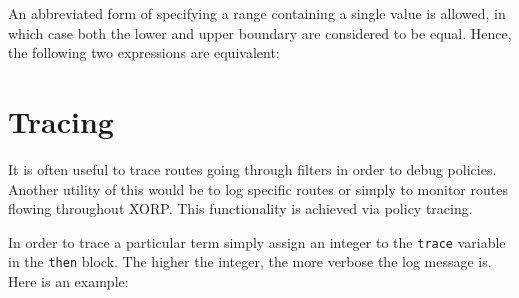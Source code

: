 \noindent{}

An abbreviated form of specifying a range containing a single value is allowed, in which case both the lower and upper boundary are considered to be equal.  Hence, the following two expressions are equivalent:

\noindent{}


\section{Tracing}
It is often useful to trace routes going through filters in order to debug
policies.  Another utility of this would be to log specific routes or simply to
monitor routes flowing throughout XORP.  This functionality is achieved via policy
tracing.

In order to trace a particular term simply assign an integer to the {\tt trace}
variable in the {\tt then} block.  The higher the integer, the more verbose the
log message is.  Here is an example:

\noindent{}

